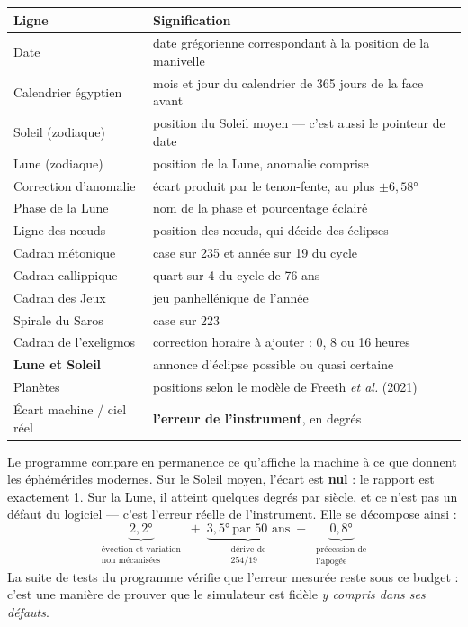 \documentclass[a4paper,11pt]{article}
\begin{document}
\begin{center}
\small
\begin{tabularx}{\textwidth}{@{}lX@{}}
\toprule
\rowcolor{lightblue}\textbf{Ligne} & \textbf{Signification} \\
\midrule
Date & date grégorienne correspondant à la position de la manivelle \\
Calendrier égyptien & mois et jour du calendrier de 365 jours de la face avant \\
Soleil (zodiaque) & position du Soleil moyen — c'est aussi le pointeur de date \\
Lune (zodiaque) & position de la Lune, anomalie comprise \\
Correction d'anomalie & écart produit par le tenon-fente, au plus $\pm 6{,}58°$ \\
Phase de la Lune & nom de la phase et pourcentage éclairé \\
Ligne des n\oe uds & position des n\oe uds, qui décide des éclipses \\
Cadran métonique & case sur 235 et année sur 19 du cycle \\
Cadran callippique & quart sur 4 du cycle de 76 ans \\
Cadran des Jeux & jeu panhellénique de l'année \\
Spirale du Saros & case sur 223 \\
Cadran de l'exeligmos & correction horaire à ajouter : 0, 8 ou 16 heures \\
\textbf{Lune et Soleil} & annonce d'éclipse possible ou quasi certaine \\
Planètes & positions selon le modèle de Freeth \textit{et al.} (2021) \\
Écart machine / ciel réel & \textbf{l'erreur de l'instrument}, en degrés \\
\bottomrule
\end{tabularx}
\end{center}

\begin{info}
Le programme compare en permanence ce qu'affiche la machine à ce que donnent
les éphémérides modernes. Sur le Soleil moyen, l'écart est \textbf{nul} : le
rapport est exactement 1. Sur la Lune, il atteint quelques degrés par siècle,
et ce n'est pas un défaut du logiciel — c'est l'erreur réelle de l'instrument.
Elle se décompose ainsi :
\[
\underbrace{2{,}2°}_{\substack{\text{évection et variation}\\ \text{non mécanisées}}}
\;+\;
\underbrace{3{,}5°\ \text{par 50 ans}}_{\substack{\text{dérive de}\\ 254/19}}
\;+\;
\underbrace{0{,}8°}_{\substack{\text{précession de}\\ \text{l'apogée}}}
\]
La suite de tests du programme vérifie que l'erreur mesurée reste sous ce
budget : c'est une manière de prouver que le simulateur est fidèle \emph{y
compris dans ses défauts}.
\end{info}
\end{document}

